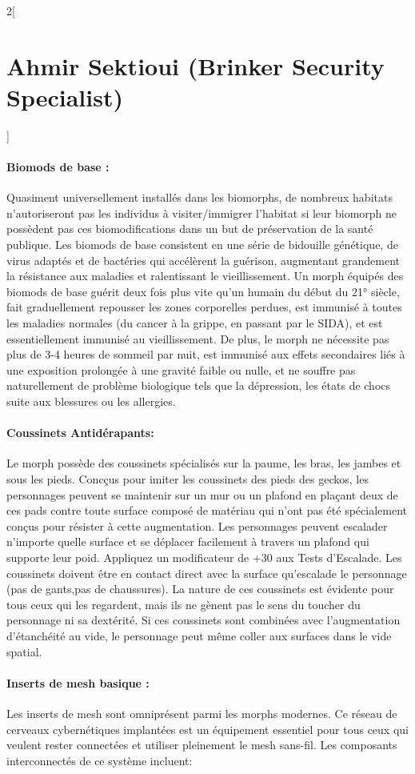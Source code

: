 \documentclass[a4paper,9pt]{article}
\begin{document}
\begin{multicols}{2}[\section*{Ahmir Sektioui (Brinker Security Specialist)}]
   \paragraph{Biomods de base :} 
   Quasiment universellement  installés dans les biomorphs, de nombreux habitats
   n'autoriseront pas les individus à visiter/immigrer l'habitat si leur biomorph
   ne possèdent pas ces biomodifications dans un but de préservation de la santé
   publique. Les biomods de base consistent en une série de bidouille génétique,
   de virus adaptés et de bactéries qui accélèrent la guérison, augmentant
   grandement la résistance aux maladies et ralentissant le vieillissement. Un
   morph équipés des biomods de base guérit deux fois plus vite qu'un humain du
   début du 21° siècle, fait graduellement repousser les zones corporelles
   perdues, est immunisé à toutes les maladies normales (du cancer à la grippe, en
   passant par le SIDA), et est essentiellement immunisé au vieillissement. De
   plus, le morph ne nécessite pas plus de 3-4 heures de sommeil par nuit, est
   immunisé aux effets secondaires liés à une exposition prolongée à une gravité
   faible ou nulle, et ne souffre pas naturellement de problème biologique tels
   que la dépression, les états de chocs suite aux blessures ou les allergies.

   \paragraph{Coussinets Antidérapants:} Le morph possède des coussinets spécialisés
   sur la paume, les bras, les jambes et sous les pieds. Concçus pour imiter les
   coussinets des pieds des geckos, les personnages peuvent se maintenir sur un mur
   ou un plafond en plaçant deux de ces pads contre toute surface composé de
   matériau qui n'ont pas été spécialement conçus pour résister à cette
   augmentation. Les personnages peuvent escalader n'importe quelle surface et se
   déplacer facilement à travers un plafond qui supporte leur poid. Appliquez un
   modificateur de +30 aux Tests d'Escalade. Les coussinets doivent être en contact
   direct avec la surface qu'escalade le personnage (pas de gants,pas de
   chaussures). La nature de ces coussinets est évidente pour tous ceux qui les
   regardent, mais ils ne gènent pas le sens du toucher du personnage ni sa
   dextérité. Si ces coussinets sont combinées avec l'augmentation d'étanchéité au
   vide, le personnage peut même coller aux surfaces dans le vide spatial.


   \paragraph{Inserts de mesh basique :} 
   Les inserts de mesh sont omniprésent parmi les morphs modernes. Ce réseau de
   cerveaux cybernétiques implantées est un équipement essentiel pour tous ceux
   qui veulent rester connectées et utiliser pleinement le mesh sans-fil. Les
   composants interconnectés de ce système incluent: 


\end{multicols}
\end{document}
